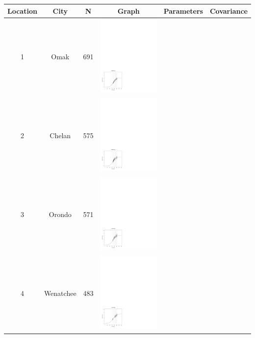 
		\begin{tabular}{cccccc}
		\hline	
		\hline		
		{\bf{Location}} & {\bf{City}} & {\bf{N}}& {\bf{Graph}} & {\bf{Parameters}} & {\bf{Covariance}}   \\
		\hline
		{1}		& Omak		& 691	& \includegraphics[height=40mm]{graphics/location_1.pdf} &  &  \\
		{2}		& Chelan	& 575 	& \includegraphics[height=40mm]{graphics/location_2.pdf} &  &  \\
		{3}		& Orondo	& 571 	& \includegraphics[height=40mm]{graphics/location_3.pdf} &  &  \\
		{4}		& Wenatchee	& 483 	& \includegraphics[height=40mm]{graphics/location_4.pdf} &  &  \\

\end{tabular}
